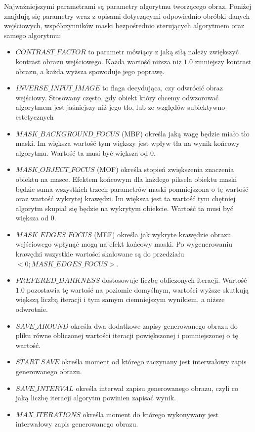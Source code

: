     Najważniejszymi parametrami są parametry algorytmu tworzącego obraz. Poniżej znajdują się parametry wraz z opisami dotyczącymi odpowiednio obróbki danych wejściowych, współczynników maski bezpośrednio sterujących algorytmem oraz samego algorytmu:
    \begin{itemize}
        \item \(CONTRAST\_FACTOR\) to parametr mówiący z jaką siłą należy zwiększyć kontrast obrazu wejściowego. Każda wartość niższa niż \(1.0\) zmniejszy kontrast obrazu, a każda wyższa spowoduje jego poprawę.
        \item \(INVERSE\_INPUT\_IMAGE\) to flaga decydująca, czy odwrócić obraz wejściowy. Stosowany często, gdy obiekt który chcemy odwzorować algorytmem jest jaśniejszy niż jego tło, lub ze względów subiektywno-estetycznych 
        \item \(MASK\_BACKGROUND\_FOCUS\) (MBF) określa jaką wagę będzie miało tło maski. Im większa wartość tym większy jest wpływ tła na wynik końcowy algorytmu. Wartość ta musi być większa od 0.
        \item \(MASK\_OBJECT\_FOCUS\) (MOF) określa stopień zwiększenia znaczenia obiektu na masce. Efektem końcowym dla każdego piksela obiektu maski będzie suma wszystkich trzech parametrów maski pomniejszona o tę wartość oraz wartość wykrytej krawędzi. Im większa jest ta wartość tym chętniej algorytm skupiał się będzie na wykrytym obiekcie. Wartość ta musi być większa od 0.
        \item \(MASK\_EDGES\_FOCUS\) (MEF) określa jak wykryte krawędzie obrazu wejściowego wpłynąć mogą na efekt końcowy maski. Po wygenerowaniu krawędzi wszystkie wartości skalowane są do przedziału \(<0;MASK\_EDGES\_FOCUS>\).
        \item \(PREFERED\_DARKNESS\) dostosowuje liczbę obliczonych iteracji. Wartość \(1.0\) pozostawia tę wartość na poziomie domyślnym, wartości wyższe skutkują większą liczbą iteracji i tym samym ciemniejszym wynikiem, a niższe odwrotnie.
        \item \(SAVE\_AROUND\) określa dwa dodatkowe zapisy generowanego obrazu do pliku równe obliczonej wartości iteracji powiększonej i pomniejszonej o tę wartość.
        \item \(START\_SAVE\) określa moment od którego zaczynany jest interwałowy zapis generowanego obrazu.
        \item \(SAVE\_INTERVAL\) określa interwał zapisu generowanego obrazu, czyli co jaką liczbę iteracji algorytm powinien zapisać wynik.
        \item \(MAX\_ITERATIONS\) określa moment do którego wykonywany jest interwałowy zapis generowanego obrazu.

\end{itemize}
